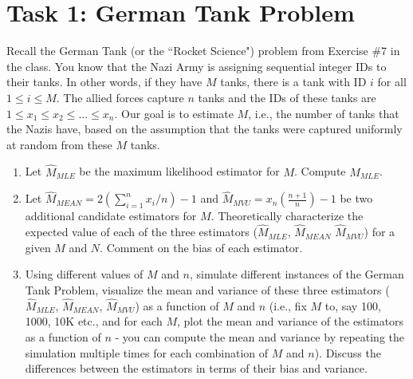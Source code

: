 \documentclass[11pt]{article}
\begin{document}

\section*{Task 1: German Tank Problem}
Recall the German Tank (or the ``Rocket Science") problem from Exercise \#7 in the class. You know that the Nazi Army is assigning sequential integer IDs to their tanks. In other words, if they have $M$ tanks, there is a tank with ID $i$ for all $1\leq i \leq M$. The allied forces capture $n$ tanks and the IDs of these tanks are $1 \leq x_1 \leq  x_2 \leq  ... \leq x_n$. Our goal is to estimate $M$, i.e., the number of tanks that the Nazis have, based on the assumption that the tanks were captured uniformly at random from these $M$ tanks. 

\begin{enumerate}
\item[(a)]
Let $\hat{M}_{MLE}$ be the maximum likelihood estimator for $M$. Compute $\hat{M}_{MLE}$.

\item[(b)]
Let $\hat{M}_{MEAN} = 2(\sum_{i=1}^n{x_i}/n)-1$
and  $\hat{M}_{MVU}=x_n(\frac{n+1}{n})-1$ be two additional candidate estimators for $M$. 
Theoretically characterize the expected value of each of the three estimators   ($\hat{M}_{MLE}$, $\hat{M}_{MEAN}$
$\hat{M}_{MVU}$) for a given $M$ and $N$.
Comment on the bias of each estimator.

\item[(c)]
Using different values of $M$ and $n$, simulate different instances of the German Tank Problem, visualize the mean and variance of these three estimators ($\hat{M}_{MLE}$, $\hat{M}_{MEAN}$,
$\hat{M}_{MVU}$) as a function of $M$ and $n$ (i.e., fix $M$ to, say 100, 1000, 10K etc., and
for each $M$, plot the mean and variance of the estimators as a function of $n$ - you can compute the mean and variance by repeating the
simulation multiple times for each combination of $M$ and $n$). Discuss the differences between the estimators in terms of their bias and variance.
\end{enumerate}

\end{document}
